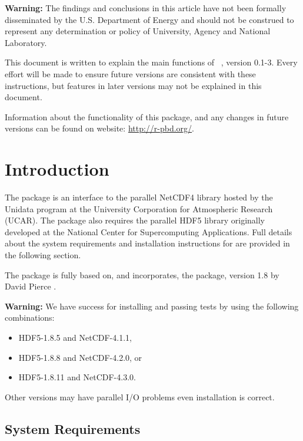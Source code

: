 {\color{red} \bf Warning:}
The findings and conclusions in this article have not been
formally disseminated by the U.S. Department of Energy
and should not be construed to represent any determination or
policy of University, Agency and National Laboratory.

This document is written to explain the main
functions of ~\citep{Ostrouchov2012pbdNCDF4package},
version 0.1-3.
Every effort will be made to ensure future versions are consistent with
these instructions, but features in later versions may not be explained
in this document.

Information about the functionality of this package,
and any changes in future versions can be found on website:
\url{http://r-pbd.org/}.




\section{Introduction}
\label{sec:quick_start}

The  package is an interface to the parallel NetCDF4 library \citep{netcdf} hosted by the Unidata program at the University Corporation for Atmospheric Research (UCAR). The package also requires the parallel HDF5 library \citep{hdf5} originally developed at the National Center for Supercomputing Applications. Full details about the system requirements and installation instructions for  are provided in the following section.

The  package is fully based on, and incorporates, the  package, version 1.8 by David Pierce \citep{ncdf4}.  

{\color{red} \bf Warning:}
We have success for installing and passing tests by using the following
combinations:
\begin{itemize}
\item HDF5-1.8.5 and NetCDF-4.1.1,
\item HDF5-1.8.8 and NetCDF-4.2.0, or
\item HDF5-1.8.11 and NetCDF-4.3.0.
\end{itemize}
Other versions may have parallel I/O problems even installation is correct.


\subsection[System Requirements]{System Requirements}
\label{sec:system_requirements}

